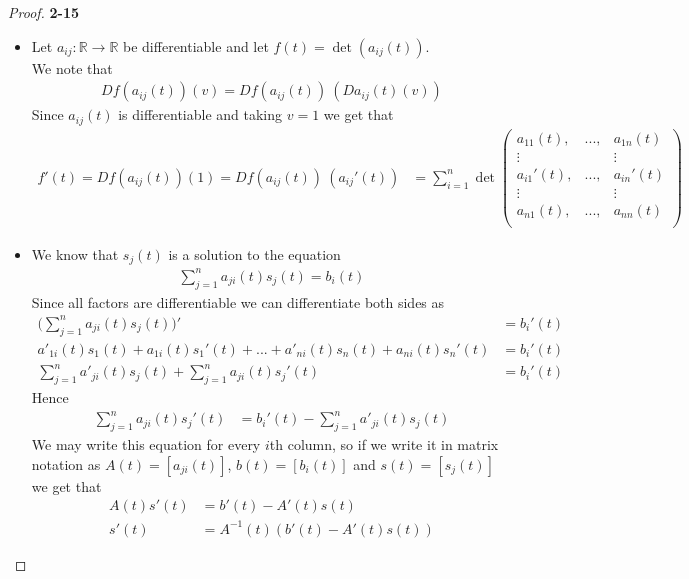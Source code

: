\documentclass[11pt]{article}
\newcommand{\R}{\mathbb{R}}
\theoremstyle{definition}
\begin{document}
\begin{proof}{\textbf{2-15}}
\begin{itemize}
\begin{align*}
    \end{align*}
    \item [(b)] Let $a_{ij}:\R \to \R$ be differentiable and let
    $f(t) = \det(a_{ij}(t))$.
    \\
    We note that
    \begin{align*}
        Df(a_{ij}(t))(v) = Df(a_{ij}(t))~(Da_{ij}(t)(v))
    \end{align*}
    Since $a_{ij}(t)$ is differentiable and taking $v = 1$ we get that 
    \begin{align*}
        f'(t) = Df(a_{ij}(t))(1) 
        = Df(a_{ij}(t))~(a_{ij}'(t))
        &= \sum_{i=1}^n \det\begin{pmatrix}
            a_{11}(t), & ..., & a_{1n}(t)\\
            \vdots &  & \vdots \\
            a_{i1}'(t), & ..., & a_{in}'(t)\\
            \vdots &  & \vdots \\
            a_{n1}(t), & ..., & a_{nn}(t)\\
        \end{pmatrix}
    \end{align*}

\cleardoublepage
    \item [(c)] We know that $s_j(t)$ is a solution to the equation
    \begin{align*}
        \sum_{j=1}^n a_{ji}(t)s_j(t) = b_i(t)
    \end{align*}
    Since all factors are differentiable  we can differentiate both sides as
    \begin{align*}
        \bigg(\sum_{j=1}^n a_{ji}(t)s_j(t)\bigg)' &= b_i'(t)\\
        a'_{1i}(t)s_1(t) + a_{1i}(t)s_1'(t) + ... +
        a'_{ni}(t)s_n(t) + a_{ni}(t)s_n'(t)
        &= b_i'(t)\\
        \sum_{j=1}^n a'_{ji}(t)s_j(t) + \sum_{j=1}^n a_{ji}(t)s_j'(t)
        &= b_i'(t)
    \end{align*}
    Hence
    \begin{align*}
        \sum_{j=1}^n a_{ji}(t)s_j'(t) &= b_i'(t) - \sum_{j=1}^n a'_{ji}(t)s_j(t)
    \end{align*}
    We may write this equation for every $i$th column, so if we write it in
    matrix notation as $A(t) = [a_{ji}(t)]$, $b(t) = [b_i(t)]$ and
    $s(t) = [s_j(t)]$ we get that
    \begin{align*}
        A(t)s'(t) &= b'(t) - A'(t)s(t)\\
        s'(t) &= A^{-1}(t)(b'(t) - A'(t)s(t))
    \end{align*}
\end{itemize}
\end{proof}
\end{document}
